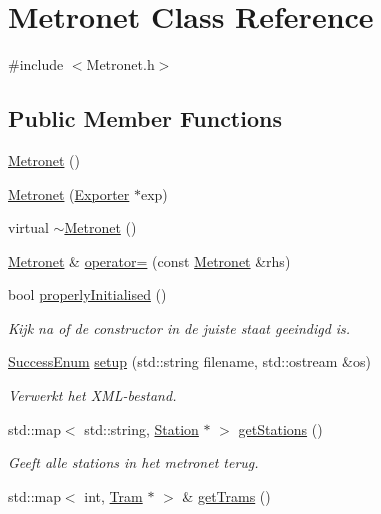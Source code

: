 \hypertarget{class_metronet}{}\section{Metronet Class Reference}
\label{class_metronet}


{\ttfamily \#include $<$Metronet.\+h$>$}

\subsection*{Public Member Functions}
\begin{DoxyCompactItemize}
\item 
\hyperlink{class_metronet_abdd205c39857ed1aabd104a6886cad45}{Metronet} ()
\item 
\hyperlink{class_metronet_a2f8f40f437a1ae14ea78d306aaed6bd4}{Metronet} (\hyperlink{class_exporter}{Exporter} $\ast$exp)
\item 
virtual \hyperlink{class_metronet_afa96be4bf66f8d7dcf3f40a7487d2ea7}{$\sim$\+Metronet} ()
\item 
\hyperlink{class_metronet}{Metronet} \& \hyperlink{class_metronet_a116ec9674637a45ff59cbb2cebb8dd21}{operator=} (const \hyperlink{class_metronet}{Metronet} \&rhs)
\item 
bool \hyperlink{class_metronet_a3d2adce29a947f162924279b766de645}{properly\+Initialised} ()
\begin{DoxyCompactList}\small\item\em Kijk na of de constructor in de juiste staat geeindigd is. \end{DoxyCompactList}\item 
\hyperlink{_metronet_8h_ae69e1bf070c1c339170236b3fef70a4d}{Success\+Enum} \hyperlink{class_metronet_ad12d6e52c7f5c23d23e87992b4abc1fa}{setup} (std\+::string filename, std\+::ostream \&os)
\begin{DoxyCompactList}\small\item\em Verwerkt het X\+M\+L-\/bestand. \end{DoxyCompactList}\item 
std\+::map$<$ std\+::string, \hyperlink{class_station}{Station} $\ast$ $>$ \hyperlink{class_metronet_a756f8163c67c4e559699b9c508fb1346}{get\+Stations} ()
\begin{DoxyCompactList}\small\item\em Geeft alle stations in het metronet terug. \end{DoxyCompactList}\item 
std\+::map$<$ int, \hyperlink{class_tram}{Tram} $\ast$ $>$ \& \hyperlink{class_metronet_a9aab7bfe14dbd5f7e258a55007542c36}{get\+Trams} ()

\end{DoxyCompactItemize}
